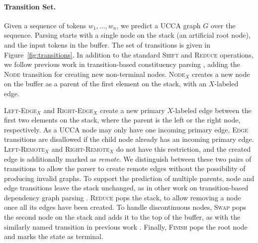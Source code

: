 \documentclass[11pt,a4paper]{article}
\newcommand{\figref}[1]{Figure~\ref{#1}}
\begin{document}
\paragraph{Transition Set.}
Given a sequence of tokens $w_1, \ldots, w_n$, we predict a UCCA graph $G$ over the sequence.
Parsing starts with a single node on the stack (an artificial root node), and the input tokens
in the buffer. The set of transitions is given in \figref{fig:transitions}.
In addition to the standard \textsc{Shift} and \textsc{Reduce} operations, 
we follow previous work in transition-based constituency parsing \cite{sagae2005classifier},
adding the \textsc{Node} transition for creating new non-terminal nodes.
\textsc{Node$_X$} creates a new node on the buffer as a parent of the first element on the stack, with an $X$-labeled edge.

\textsc{Left-Edge$_X$} and \textsc{Right-Edge$_X$} create a new primary $X$-labeled edge between the first two elements on the stack, where the parent is the left or the right node, respectively.
As a UCCA node may only have one incoming primary edge,
\textsc{Edge} transitions are disallowed if the child node already
has an incoming primary edge.
\textsc{Left-Remote$_X$} and \textsc{Right-Remote$_X$} do not have this restriction,
and the created edge is additionally marked as \textit{remote}.
We distinguish between these two pairs of transitions to allow the parser to create remote edges
without the possibility of producing invalid graphs.
To support the prediction of multiple parents, node and edge transitions
leave the stack unchanged, as in other work on
transition-based dependency graph parsing
\cite{sagae2008shift,ribeyre-villemontedelaclergerie-seddah:2014:SemEval,tokgoz2015transition}.
\textsc{Reduce} pops the stack, to allow removing a node
once all its edges have been created.
To handle discontinuous nodes, \textsc{Swap} pops the second
node on the stack and adds it to the top of the buffer, as with the similarly
named transition in previous work \cite{nivre2009non,maier2015discontinuous}.
Finally, \textsc{Finish} pops the root node and marks the state as terminal.
\end{document}
